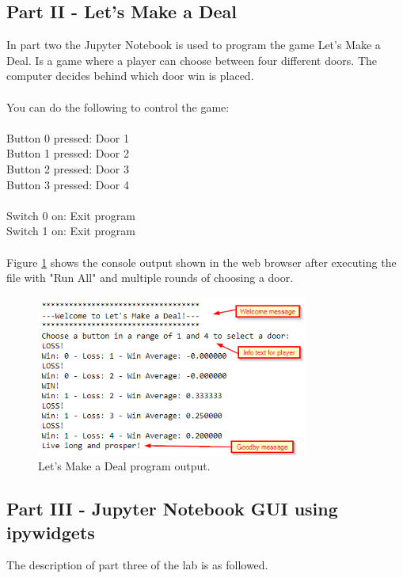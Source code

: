 \subsection{Part II - Let's Make a Deal}\label{subsec: Part II - Let's Make a Deal}
In part two the Jupyter Notebook is used to program the game Let's Make a Deal. Is a game where a player can choose between four different doors. The computer decides behind which door win is placed.\\
\\
You can do the following to control the game:\\
\\
Button 0 pressed: \hfil       Door 1\\
Button 1 pressed:   \hfil     Door 2\\
Button 2 pressed: \hfil       Door 3\\
Button 3 pressed: \hfil       Door 4\\
\\
Switch 0 on:   \hfil          Exit program\\
Switch 1 on:    \hfil         Exit program\\
\\
Figure \ref{fig: part2_output} shows the console output shown in the web browser after executing the file with "Run All" and multiple rounds of choosing a door.
	\begin{figure}[H]
	\centering
	\includegraphics[width=0.8\textwidth]{01_images/part2_output.PNG}
	\caption{Let's Make a Deal program output.}
	\label{fig: part2_output}
	\end{figure}

\subsection{Part III - Jupyter Notebook GUI using ipywidgets }
The description of part three of the lab is as followed. 

